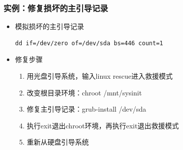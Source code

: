 \documentclass[xcolor=svgnames,presentation]{beamer}
\begin{document}
\begin{frame}[fragile]
\frametitle{实例：修复损坏的主引导记录}
\label{sec-1-14}
\begin{itemize}

\item 模拟损坏的主引导记录\\
\label{sec-1-14-1}%
\begin{verbatim}
dd if=/dev/zero of=/dev/sda bs=446 count=1
\end{verbatim}

\item 修复步骤
\label{sec-1-14-2}%
\begin{enumerate}
\item 用光盘引导系统，输入linux rescue进入救援模式
\item 改变根目录环境：chroot /mnt/sysinit
\item 修复主引导记录：grub-install /dev/sda
\item 执行exit退出chroot环境，再执行exit退出救援模式
\item 重新从硬盘引导系统
\end{enumerate}
\end{itemize} %
\end{frame}
\end{document}
